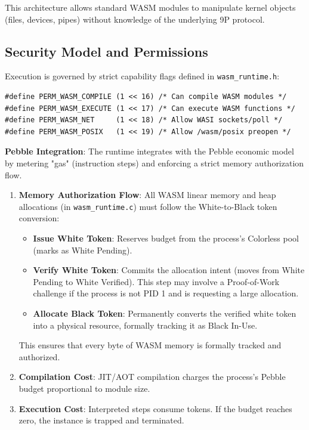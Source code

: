 \documentclass[11pt,letterpaper]{article}
\begin{document}
This architecture allows standard WASM modules to manipulate kernel objects (files, devices, pipes) without knowledge of the underlying 9P protocol.

\subsection{Security Model and Permissions}

Execution is governed by strict capability flags defined in \texttt{wasm_runtime.h}:

\begin{lstlisting}
#define PERM_WASM_COMPILE (1 << 16) /* Can compile WASM modules */
#define PERM_WASM_EXECUTE (1 << 17) /* Can execute WASM functions */
#define PERM_WASM_NET     (1 << 18) /* Allow WASI sockets/poll */
#define PERM_WASM_POSIX   (1 << 19) /* Allow /wasm/posix preopen */
\end{lstlisting}

\textbf{Pebble Integration}:
The runtime integrates with the Pebble economic model by metering "gas" (instruction steps) and enforcing a strict memory authorization flow.
\begin{enumerate}
\item \textbf{Memory Authorization Flow}: All WASM linear memory and heap allocations (in \texttt{wasm_runtime.c}) must follow the White-to-Black token conversion:
    \begin{itemize}
    \item \textbf{Issue White Token}: Reserves budget from the process's Colorless pool (marks as White Pending).
    \item \textbf{Verify White Token}: Commits the allocation intent (moves from White Pending to White Verified). This step may involve a Proof-of-Work challenge if the process is not PID 1 and is requesting a large allocation.
    \item \textbf{Allocate Black Token}: Permanently converts the verified white token into a physical resource, formally tracking it as Black In-Use.
    \end{itemize}
    This ensures that every byte of WASM memory is formally tracked and authorized.
\item \textbf{Compilation Cost}: JIT/AOT compilation charges the process's Pebble budget proportional to module size.
\item \textbf{Execution Cost}: Interpreted steps consume tokens. If the budget reaches zero, the instance is trapped and terminated.
\end{enumerate}
\end{document}

